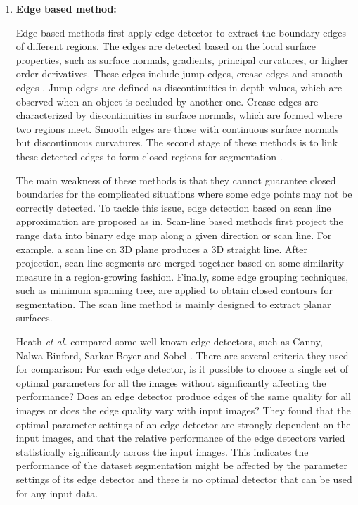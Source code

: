 \begin{enumerate}

\item {\bf Edge based method:}

Edge based methods first apply edge detector to
extract the boundary edges of different regions.
The edges are detected based on the local surface properties,
such as surface normals, gradients, principal curvatures,
or higher order derivatives.
These edges include jump edges, crease edges and smooth edges \cite{MS_JBU}.
Jump edges are defined as discontinuities in depth values,
which are observed when an object is occluded by another one.
Crease edges are characterized by discontinuities in surface normals,
which are formed where two regions meet.
Smooth edges are those with continuous surface normals but
discontinuous curvatures.
The second stage of these methods is to link these detected edges
to form closed regions for segmentation \cite{MS_SV,MS_KS}.

The main weakness of these methods is that
they cannot guarantee closed boundaries
for the complicated situations where some edge points
may not be correctly detected.
To tackle this issue, edge detection based on
scan line approximation are proposed as in\cite{MS_SD,MS_KMK,MS_JB}.
Scan-line based methods first project the range data into
binary edge map along a given direction or scan line.
For example, a scan line on 3D plane produces a 3D straight line.
After projection, scan line segments are merged together
based on some similarity measure in a region-growing fashion.
Finally, some edge grouping techniques, such as
minimum spanning tree, are applied to obtain closed contours
for segmentation.
The scan line method is mainly designed to extract planar surfaces.

Heath {\it et al.} compared some well-known edge detectors,
such as Canny, Nalwa-Binford, Sarkar-Boyer and Sobel \cite{MS_HSSB}.
There are several criteria they used for comparison:
For each edge detector,
is it possible to choose a single set of optimal parameters
for all the images without significantly affecting the performance?
Does an edge detector produce edges of the same quality for all images
or does the edge quality vary with input images?
They found that the optimal parameter settings of an edge detector
are strongly dependent on the input images,
and that the relative performance of the edge detectors varied
statistically significantly across the input images.
This indicates the performance of the dataset segmentation
might be affected by the parameter settings of its edge detector
and there is no optimal detector that can be used for any input data.



\end{enumerate}
